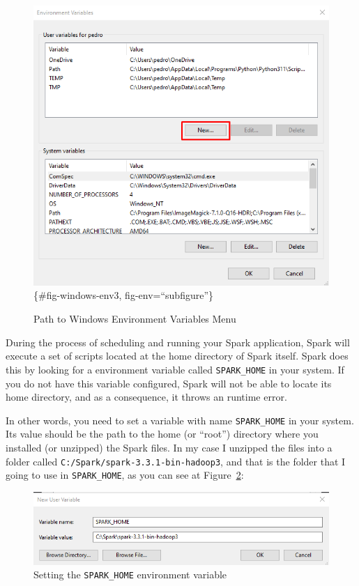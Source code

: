 \documentclass[
  11pt,
  letterpaper,
  DIV=11,
  numbers=noendperiod]{scrreprt}
\begin{document}
\begin{figure}
{\includegraphics{Chapters/../Figures/windows-environment-variables3.png}\{\#fig-windows-env3,
fig-env=``subfigure''\}

}

\caption{\label{fig-windows-envs}Path to Windows Environment Variables
Menu}

\end{figure}

During the process of scheduling and running your Spark application,
Spark will execute a set of scripts located at the home directory of
Spark itself. Spark does this by looking for a environment variable
called \texttt{SPARK\_HOME} in your system. If you do not have this
variable configured, Spark will not be able to locate its home
directory, and as a consequence, it throws an runtime error.

In other words, you need to set a variable with name
\texttt{SPARK\_HOME} in your system. Its value should be the path to the
home (or ``root'') directory where you installed (or unzipped) the Spark
files. In my case I unzipped the files into a folder called
\texttt{C:/Spark/spark-3.3.1-bin-hadoop3}, and that is the folder that I
going to use in \texttt{SPARK\_HOME}, as you can see at
Figure~\ref{fig-spark-home-env}:

\begin{figure}

{\centering \includegraphics{Chapters/../Figures/windows-environment-variables4.png}

}

\caption{\label{fig-spark-home-env}Setting the \texttt{SPARK\_HOME}
environment variable}

\end{figure}
\end{document}
